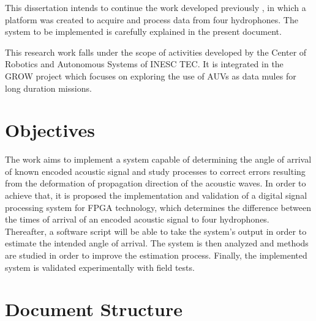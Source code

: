 
This dissertation intends to continue the work developed previously \cite{afonso-thesis}, in which a platform was created to acquire and process data from four hydrophones. The system to be implemented is carefully explained in the present document.
 

This research work falls under the scope of activities developed by the Center of Robotics and Autonomous Systems of INESC TEC. It is integrated in the GROW project which focuses on exploring the use of AUVs as data mules for long duration missions.


\section{Objectives} \label{sec:objective}

The work aims to implement a system capable of determining the angle of arrival of known encoded acoustic signal and study processes to correct errors resulting from the deformation of propagation direction of the acoustic waves. In order to achieve that, it is proposed the implementation and validation of a digital signal processing system for FPGA technology, which determines the difference between the times of arrival of an encoded acoustic signal to four hydrophones. Thereafter, a software script will be able to take the system's output in order to estimate the intended angle of arrival. The system is then analyzed and methods are studied in order to improve the estimation process. Finally, the implemented system is validated experimentally with field tests.

\section{Document Structure}

